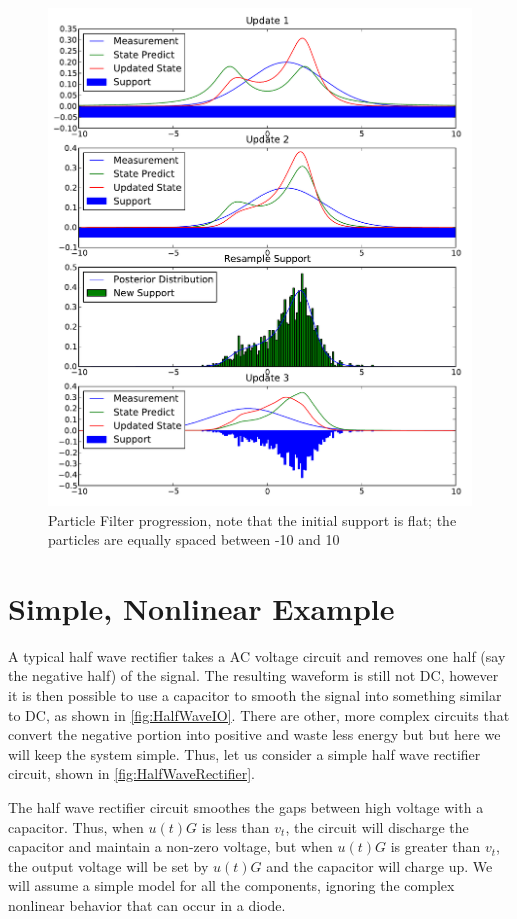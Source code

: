 \begin{figure}
\includegraphics[width=16cm]{images/particle_filter}
\caption{Particle Filter progression, note that the initial support is flat; the particles
are equally spaced between -10 and 10}
\end{figure}

\section{Simple, Nonlinear Example}
A typical half wave rectifier takes a AC voltage circuit and removes
one half (say the negative half) of the signal. The resulting waveform
is still not DC, however it is then possible to use a capacitor to 
smooth the signal into something similar to DC, as shown in \autoref{fig:HalfWaveIO}.
There are other, more
complex circuits that convert the negative portion into positive and
waste less energy but but here we will keep the system simple.
Thus, let us consider a simple half wave rectifier circuit, shown in 
\autoref{fig:HalfWaveRectifier}.

The half wave rectifier circuit smoothes the gaps between high voltage
with a capacitor. Thus, when $u(t)G$ is less than $v_t$, the circuit will 
discharge the capacitor and maintain a non-zero voltage,
but when $u(t)G$ is greater than $v_t$, the output voltage will be set
by $u(t)G$ and the capacitor will charge up. We will assume a simple
model for all the components, ignoring the complex nonlinear behavior
that can occur in a diode. 

